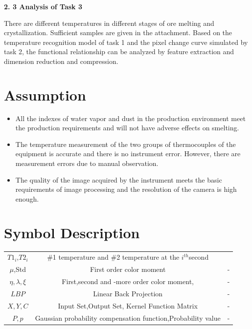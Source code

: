 \documentclass{apmcmthesis}
\begin{document}
	\noindent\textbf{2. 3 Analysis of Task 3}
		
		There are different temperatures in different stages of ore melting and crystallization. Sufficient samples are given in the attachment. Based on the temperature recognition model of task 1 and the pixel change curve simulated by task 2, the functional relationship can be analyzed by feature extraction and dimension reduction and compression.
		
\section{Assumption}
	\begin{itemize}
	  \item All the indexes of water vapor and dust in the production environment meet the production requirements and will not have adverse effects on smelting.
	  
	  \item The temperature measurement of the two groups of thermocouples of the equipment is accurate and there is no instrument error. However, there are measurement errors due to manual observation.
	  
	  \item The quality of the image acquired by the instrument meets the basic requirements of image processing and the resolution of the camera is high enough.
	\end{itemize}
\section{Symbol Description}
	\begin{center}
	\small
	\tabcolsep=0.05cm
	\renewcommand\arraystretch{3}
	\begin{tabular}{ccc}
		\toprule
		\hline
		\makebox[0.2\textwidth][c]{Symbol}	& \makebox[0.35\textwidth][c]{Meaning} & \makebox[0.15\textwidth][c]{Unit}	 \\ \hline
	
		$T1_{i}$,$T2_{i}$& \#1 temperature   and \#2 temperature at the $i^{th}$second & \textcelsius \\ \hline
		$\mu $,Std   & First order color moment&  -\\ \hline
			$\eta,\lambda,\xi $   & First,second and -more order color moment,&  -\\ \hline
		$LBP$    &Linear Back Projection &  -\\ \hline
		$X,Y,C$	    & Input Set,Output Set, Kernel Function Matrix&  -\\ \hline
		$P,p$	    & Gaussian probability compensation function,Probability value&  -\\ \hline
		\bottomrule
\end{tabular}
\end{center}
\end{document}
